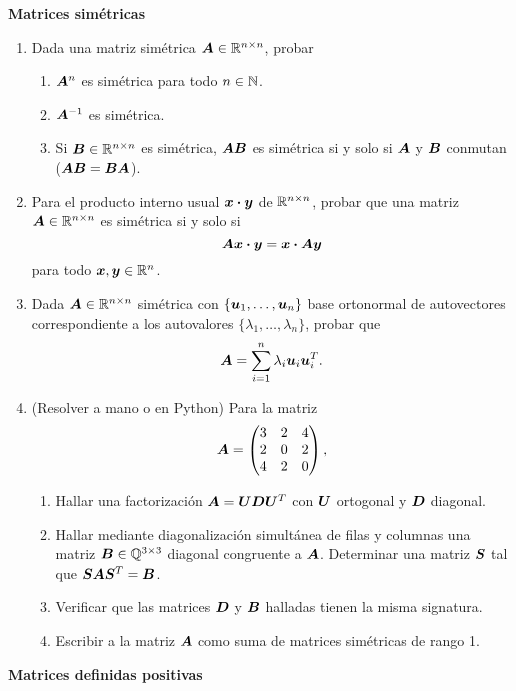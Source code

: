 \documentclass[11pt]{article}
\begin{document}
\noindent \textbf{Matrices simétricas}
\begin{enumerate}[resume]

\item
Dada una matriz simétrica $\bm{A} \in \mathbb{R}^{n\times n}$, probar
\begin{enumerate}
\item $\bm{A}^n$ es simétrica para todo $n \in \mathbb{N}$.
\item $\bm{A}^{-1}$ es simétrica.
\item Si $\bm{B} \in \mathbb{R}^{n\times n}$ es simétrica, $\bm{A}\bm{B}$ es simétrica si y solo si $\bm{A}$ y $\bm{B}$ conmutan ($\bm{A}\bm{B} = \bm{B}\bm{A}$).
\end{enumerate}

\item Para el producto interno usual $\bm{x} \boldsymbol{\cdot} \bm{y}$ de $\mathbb{R}^{n\times n}$, probar que una matriz $\bm{A} \in \mathbb{R}^{n\times n}$ es simétrica si y solo si
$$
\bm{A} \bm{x} \boldsymbol{\cdot} \bm{y} = \bm{x} \boldsymbol{\cdot} \bm{A} \bm{y}
$$
para todo $\bm{x}, \bm{y} \in \mathbb{R}^n$.

\item Dada $\bm{A} \in \mathbb{R}^{n\times n}$ simétrica con $\{\bm{u}_1, \dots, \bm{u}_n\}$ base ortonormal de autovectores correspondiente a los autovalores $\{\lambda_1, \dots, \lambda_n\}$, probar que
$$
\bm{A} = \sum_{i=1}^n \lambda_i \bm{u}_i \bm{u}_i^T.
$$

\item (Resolver a mano o en Python) Para la matriz
$$
\bm{A} = \begin{pmatrix}
3 & 2 & 4 \\
2 & 0 & 2 \\
4 & 2 & 0
\end{pmatrix},
$$
\begin{enumerate}
\item Hallar una factorización $\bm{A} = \bm{U} \bm{D} \bm{U}^T$ con $\bm{U}$ ortogonal y $\bm{D}$ diagonal.
\item Hallar mediante diagonalización simultánea de filas y columnas una matriz $\bm{B} \in \mathbb{Q}^{3 \times 3}$ diagonal congruente a $\bm{A}$. Determinar una matriz $\bm{S}$ tal que $\bm{S} \bm{A} \bm{S}^T = \bm{B}$.
\item Verificar que las matrices $\bm{D}$ y $\bm{B}$ halladas tienen la misma signatura.
\item Escribir a la matriz $\bm{A}$ como suma de matrices simétricas de rango 1.
\end{enumerate}



\end{enumerate}

\noindent \textbf{Matrices definidas positivas}
\end{document}
